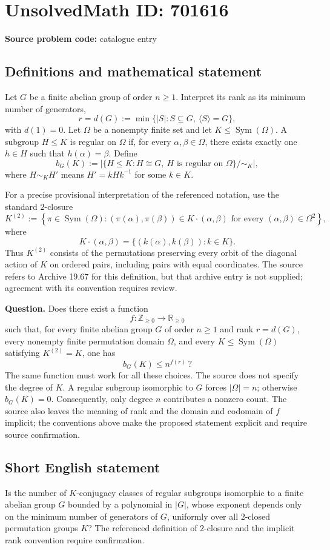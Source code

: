 \documentclass[11pt]{article}
\begin{document}
\section*{UnsolvedMath ID: 701616}
\textbf{Source problem code:} catalogue entry
\subsection{Definitions and mathematical statement}
Let \(G\) be a finite abelian group of order \(n\geq 1\). Interpret its rank as its minimum number of generators,
\[
r=d(G):=\min\{\lvert S\rvert:S\subseteq G,\ \langle S\rangle=G\},
\]
with \(d(1)=0\). Let \(\Omega\) be a nonempty finite set and let \(K\leq\operatorname{Sym}(\Omega)\). A subgroup \(H\leq K\) is regular on \(\Omega\) if, for every \(\alpha,\beta\in\Omega\), there exists exactly one \(h\in H\) such that \(h(\alpha)=\beta\). Define
\[
b_G(K):=\left\lvert\{H\leq K:H\cong G,\ H\text{ is regular on }\Omega\}/\!\sim_K\right\rvert,
\]
where \(H\sim_K H'\) means \(H'=kHk^{-1}\) for some \(k\in K\).

For a precise provisional interpretation of the referenced notation, use the standard \(2\)-closure
\[
K^{(2)}:=\left\{\pi\in\operatorname{Sym}(\Omega):
(\pi(\alpha),\pi(\beta))\in K\cdot(\alpha,\beta)
\text{ for every }(\alpha,\beta)\in\Omega^2\right\},
\]
where
\[
K\cdot(\alpha,\beta)=\{(k(\alpha),k(\beta)):k\in K\}.
\]
Thus \(K^{(2)}\) consists of the permutations preserving every orbit of the diagonal action of \(K\) on ordered pairs, including pairs with equal coordinates. The source refers to Archive 19.67 for this definition, but that archive entry is not supplied; agreement with its convention requires review.

\textbf{Question.} Does there exist a function
\[
f:\mathbb Z_{\geq 0}\longrightarrow\mathbb R_{\geq 0}
\]
such that, for every finite abelian group \(G\) of order \(n\geq 1\) and rank \(r=d(G)\), every nonempty finite permutation domain \(\Omega\), and every \(K\leq\operatorname{Sym}(\Omega)\) satisfying \(K^{(2)}=K\), one has
\[
b_G(K)\leq n^{f(r)}\,?
\]
The same function must work for all these choices. The source does not specify the degree of \(K\). A regular subgroup isomorphic to \(G\) forces \(\lvert\Omega\rvert=n\); otherwise \(b_G(K)=0\). Consequently, only degree \(n\) contributes a nonzero count. The source also leaves the meaning of rank and the domain and codomain of \(f\) implicit; the conventions above make the proposed statement explicit and require source confirmation.
\subsection{Short English statement}
Is the number of \(K\)-conjugacy classes of regular subgroups isomorphic to a finite abelian group \(G\) bounded by a polynomial in \(\lvert G\rvert\), whose exponent depends only on the minimum number of generators of \(G\), uniformly over all \(2\)-closed permutation groups \(K\)? The referenced definition of \(2\)-closure and the implicit rank convention require confirmation.
\end{document}
